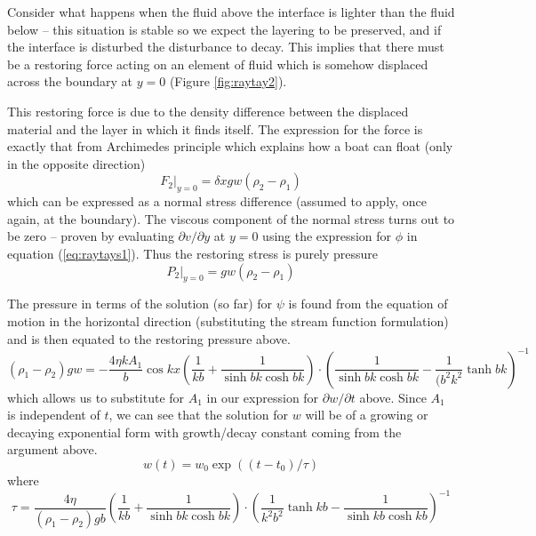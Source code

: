 \documentclass[10pt]{article}
\begin{document}
	Consider what happens when the fluid above the interface is lighter than
	the fluid below -- this situation is stable so we expect the layering to 
	be preserved, and if the interface is disturbed the disturbance to decay.
	This implies that there must be a restoring force acting on  an element
	of fluid which is somehow displaced
	across the boundary at $y=0$ (Figure \ref{fig:raytay2}).   
	
	This restoring force is due to the density difference between the displaced
	material and the layer in which it finds itself. The expression for the force
	is exactly that from Archimedes principle which explains how a boat can 
	float (only in the opposite direction)
		\begin{equation}
			\left. F_2 \right|_{y=0} = \delta x g w (\rho_2 - \rho_1) 
		\end{equation}
	which can be expressed as a normal stress difference (assumed to apply, once again,
	at the boundary). The viscous component of the normal stress turns out to be zero --
	proven by evaluating $\partial v / \partial y$ at $y=0$ using the expression for
	$\phi$ in equation (\ref{eq:raytays1}). Thus the restoring stress is purely pressure
		\begin{equation}	
			\left. P_2 \right|_{y=0} = g w (\rho_2 - \rho_1)
		\end{equation}
		
	The pressure in terms of the solution (so far) for $\psi$ is found
	from the equation of motion in the horizontal direction 
	(substituting the stream function formulation) 
	and is then equated to the restoring pressure above.
		\begin{equation}
			(\rho_1-\rho_2) g w = -\frac{4 \eta k A_1}{b} \cos kx 
					\left(\frac{1}{kb} + \frac{1}{\sinh bk \cosh bk} \right) \cdot
					\left(   \frac{1}{\sinh bk \cosh bk} - \frac{1}{(b^2k^2} \tanh bk \right)^{-1}												
		\end{equation}
	which allows us to substitute for $A_1$	in our expression for $\partial w / \partial t$
	above. Since $A_1$ is independent of $t$, we can 
	see that the solution for $w$ will be of a growing or 
	decaying exponential form with growth/decay constant
	coming from the argument above.
		\begin{equation}
			w(t) = w_0 \exp((t-t_0)/\tau)	
		\end{equation}
	where
		\begin{equation}
			\tau = \frac{4 \eta}{(\rho_1-\rho_2) g b} \left( \frac{1}{kb} + \frac{1}{\sinh bk \cosh bk} \right) \cdot
						\left(   \frac{1}{k^2b^2} \tanh kb - \frac{1}{\sinh kb \cosh kb}     \right)^{-1}
		\end{equation}
	
\end{document}
